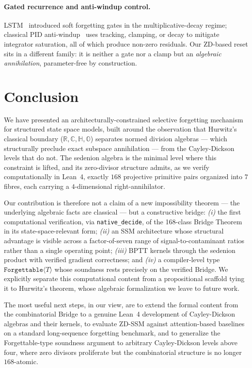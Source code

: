 \documentclass{article}
\newcommand{\Forgettable}[1]{\texttt{Forgettable}\langle #1 \rangle}
\begin{document}
\paragraph{Gated recurrence and anti-windup control.}
LSTM~\cite{hochreiter1997long} introduced soft forgetting gates in the
multiplicative-decay regime; classical PID
anti-windup~\cite{astrom1989integrator} uses tracking, clamping, or decay to
mitigate integrator saturation, all of which produce non-zero residuals. Our
ZD-based reset sits in a different family: it is neither a gate nor a
clamp but an \emph{algebraic annihilation}, parameter-free by construction.

\section{Conclusion}

We have presented an architecturally-constrained selective forgetting
mechanism for structured state space models, built around the observation
that Hurwitz's classical boundary ($\mathbb{R},\mathbb{C},\mathbb{H},\mathbb{O}$)
separates normed division algebras --- which structurally preclude exact
subspace annihilation --- from the Cayley-Dickson levels that do not. The
sedenion algebra is the minimal level where this constraint is lifted, and
its zero-divisor structure admits, as we verify computationally in Lean~4,
exactly $168$ projective primitive pairs organized into $7$ fibres, each
carrying a $4$-dimensional right-annihilator.

Our contribution is therefore not a claim of a new impossibility theorem ---
the underlying algebraic facts are classical --- but a constructive
bridge: \emph{(i)} the first computational verification, via
\texttt{native\_decide}, of the 168-class Bridge Theorem in its
state-space-relevant form; \emph{(ii)} an SSM architecture whose structural
advantage is visible across a factor-of-seven range of signal-to-contaminant
ratios rather than a single operating point; \emph{(iii)} BPTT kernels
through the sedenion product with verified gradient correctness; and
\emph{(iv)} a compiler-level type $\Forgettable{T}$ whose soundness rests
precisely on the verified Bridge. We explicitly separate this computational
content from a propositional scaffold tying it to Hurwitz's theorem, whose
algebraic formalization we leave to future work.

The most useful next steps, in our view, are to extend the formal content
from the combinatorial Bridge to a genuine Lean~4 development of
Cayley-Dickson algebras and their kernels, to evaluate ZD-SSM against
attention-based baselines on a standard long-sequence forgetting benchmark,
and to generalize the Forgettable-type soundness argument to arbitrary
Cayley-Dickson levels above four, where zero divisors proliferate but the
combinatorial structure is no longer $168$-atomic.
\end{document}
